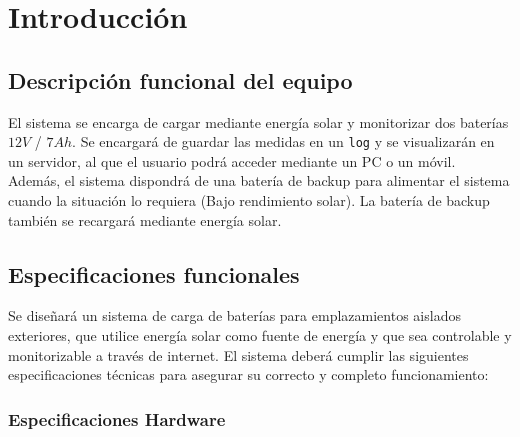 \section{Introducción}

\subsection{Descripción funcional del equipo}

El sistema se encarga de cargar mediante energía solar y monitorizar dos baterías $12 V$ / $7 Ah$. Se encargará de guardar las medidas en un \texttt{log} y se visualizarán en un servidor, al que el usuario podrá acceder mediante un PC o un móvil. Además, el sistema dispondrá de una batería de backup para alimentar el sistema cuando la situación lo requiera (Bajo rendimiento solar). La batería de backup también se recargará mediante energía solar.


\subsection{Especificaciones funcionales}

Se diseñará un sistema de carga de baterías para emplazamientos aislados exteriores, que utilice energía solar como fuente de energía y que sea controlable y monitorizable a través de internet. El sistema deberá cumplir las siguientes especificaciones técnicas para asegurar su correcto y completo funcionamiento:

\subsubsection{Especificaciones Hardware}

